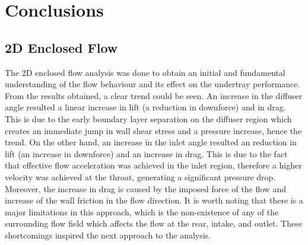 \newpage
\section{Conclusions}
\justifying
\subsection*{2D Enclosed Flow}
The 2D enclosed flow analysis was done to obtain an initial and fundamental understanding of the flow behaviour and its effect on the undertray performance. From the results obtained, a clear trend could be seen. An increase in the diffuser angle resulted a linear increase in lift (a reduction in downforce) and in drag. This is due to the early boundary layer separation on the diffuser region which creates an immediate jump in wall shear stress and a pressure increase, hence the trend. On the other hand, an increase in the inlet angle resulted an reduction in lift (an increase in downforce) and an increase in drag. This is due to the fact that effective flow acceleration was achieved in the inlet region, therefore a higher velocity was achieved at the throat, generating a significant pressure drop. Moreover, the increase in drag is caused by the imposed force of the flow and increase of the wall friction in the flow direction. It is worth noting that there is a major limitations in this approach, which is the non-existence of any of the surrounding flow field which affects the flow at the rear, intake, and outlet. These shortcomings inspired the next approach to the analysis.


